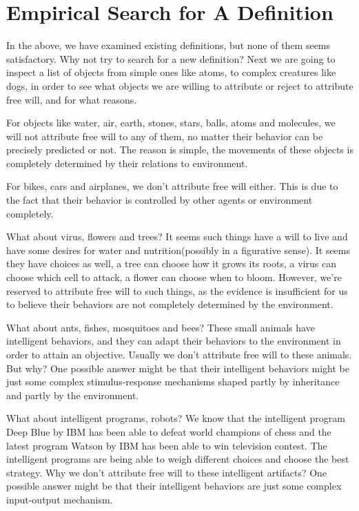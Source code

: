 \section{Empirical Search for A Definition}

In the above, we have examined existing definitions,  but none of them seems satisfactory. Why not try to search for a new definition? Next we are going to inspect a list of objects from simple ones like atoms, to complex creatures like dogs, in order to see what objects we are willing to attribute or reject to attribute free will, and for what reasons.

For objects like water, air, earth, stones, stars, balls, atoms and molecules, we will not attribute free will to any of them, no matter their behavior can be precisely predicted or not. The reason is simple, the movements of these objects is completely determined by their relations to environment.

For bikes, cars and airplanes, we don’t attribute free will either. This is due to the fact that their behavior is controlled by other agents or environment completely.

What about virus, flowers and trees? It seems such things have a will to live and have some desires for water and nutrition(possibly in a figurative sense). It seems they have choices as well, a tree can choose how it grows its roots, a virus can choose which cell to attack, a flower can choose when to bloom. However, we’re reserved to attribute free will to such things, as the evidence is insufficient for us to believe their behaviors are not completely determined by the environment.

What about ants, fishes, mosquitoes and bees? These small animals have intelligent behaviors, and they can adapt their behaviors to the environment in order to attain an objective. Usually we don’t attribute free will to these animals. But why? One possible answer might be that their intelligent behaviors might be just some complex stimulus-response mechanisms shaped partly by inheritance and partly by the environment.

What about intelligent programs, robots? We know that the intelligent program Deep Blue by IBM has been able to defeat world champions of chess and the latest program Watson by IBM  has been able to win television contest. The intelligent programs are being able to weigh different choices and choose the best strategy. Why we don’t attribute free will to these intelligent artifacts? One possible answer might be that their intelligent behaviors are just some complex input-output mechanism.

